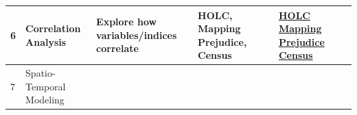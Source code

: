 \documentclass[article,12pt]{article}
\numberwithin{equation}{section}
\begin{document}
{\begin{tabular}{|l|p{.2\linewidth}|p{.2\linewidth}|p{.2\linewidth}|p{.1\linewidth}|p{.1\linewidth}|p{.1\linewidth}|}
		6 & Correlation Analysis                       & Explore how variables/indices correlate                        & HOLC, Mapping Prejudice, Census         &                                                   & \href{https://gisdata.mn.gov/dataset/us-mn-state-metc-plan-historic-holc-appraisal}{HOLC} \newline  \href{https://mappingprejudice.umn.edu/racial-covenants/maps-data}{Mapping Prejudice} \newline \href{https://data2.nhgis.org/main}{Census} &             \\ \hline
		7 & Spatio-Temporal Modeling                   &                                                                &                                         &                                                   &                                                                                                                                                                                                         &       \\ \hline     
	\end{tabular}
}
\end{document}
